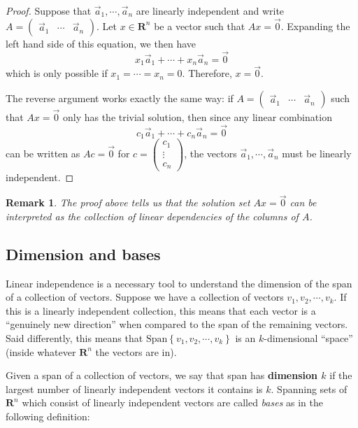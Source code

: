 \documentclass[12pt]{article}
\numberwithin{equation}{subsection}
\numberwithin{figure}{subsection}
\theoremstyle{note}
\newtheorem{remark}[subsection]{Remark}
\newcommand\Span[1]{\mathrm{Span}\left\{#1\right\}}
\begin{document}
\begin{proof}
Suppose that $\vec{a}_1,\cdots,\vec{a}_n$ are linearly independent and write $A=\begin{pmatrix} \vec{a}_1 & \cdots & \vec{a}_n\end{pmatrix}$. Let $x\in \mathbf{R}^n$ be a vector such that $Ax=\vec{0}$. Expanding the left hand side of this equation, we then have \[x_1\vec{a}_1 + \cdots + x_n \vec{a}_n =\vec{0}\] which is only possible if $x_1=\cdots=x_n=0$. Therefore, $x=\vec{0}$. 

The reverse argument works exactly the same way: if $A=\begin{pmatrix} \vec{a}_1 & \cdots & \vec{a}_n\end{pmatrix}$ such that $Ax=\vec{0}$ only has the trivial solution, then since any linear combination \[ c_1 \vec{a}_1 +\cdots+c_n\vec{a}_n=\vec{0}\] can be written as $Ac=\vec{0}$ for $c=\begin{pmatrix} c_1 \\ \vdots \\ c_n\end{pmatrix}$, the vectors $\vec{a}_1,\cdots,\vec{a}_n$ must be linearly independent. 
\end{proof}

\begin{remark}
	The proof above tells us that the solution set $Ax=\vec{0}$ can be interpreted as the collection of linear dependencies of the columns of $A$. 	
\end{remark}

\subsection{Dimension and bases}

Linear independence is a necessary tool to understand the dimension of the span of a collection of vectors. Suppose we have a collection of vectors $v_1,v_2,\cdots, v_k$. If this is a linearly independent collection, this means that each vector is a ``genuinely new direction'' when compared to the span of the remaining vectors. Said differently, this means that $\Span{v_1,v_2,\cdots,v_k}$ is an $k$-dimensional ``space'' (inside whatever $\mathbf{R}^n$ the vectors are in). 

Given a span of a collection of vectors, we say that span has \textbf{dimension $k$} if the largest number of linearly independent vectors it contains is $k$. Spanning sets of $\mathbf{R}^n$ which consist of linearly independent vectors are called \textit{bases} as in the following definition:
\end{document}
